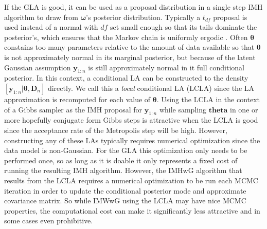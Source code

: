 \documentclass[12pt]{article}
\begin{document}
If the GLA is good, it can be used as a proposal distribution in a single step IMH algorithm to draw from $\bm{\omega}$'s posterior distribution. Typically a $t_{df}$ proposal is used instead of a normal with $df$ set small enough so that its tails dominate the posterior's, which ensures that the Markov chain is uniformly ergodic \citep[Theorem~7.8]{robert2013monte}. Often $\bm{\theta}$ constains too many parameters relative to the amount of data available so that $\bm{\theta}$ is not approximately normal in its marginal posterior, but because of the latent Gaussian assumption $\bm{y}_{1:n}$ is still approximately normal in it full conditional posterior. In this context, a conditional LA can be constructed to the density $[\bm{y}_{1:n}|\bm{\theta},\bm{D}_n]$ directly. We call this a \emph{local} conditional LA (LCLA) since the LA approximation is recomputed for each value of $\bm{\theta}$. Using the LCLA in the context of a Gibbs sampler as the IMH proposal for $\bm{y}_{1:n}$ while sampling $\bm{theta}$ in one or more hopefully conjugate form Gibbs steps is attractive when the LCLA is good since the acceptance rate of the Metropolis step will be high. However, constructing any of these LAs typically requires numerical optimization since the data model is non-Gaussian. For the GLA this optimization only needs to be performed once, so as long as it is doable it only represents a fixed cost of running the resulting IMH algorithm. However, the IMHwG algorithm that results from the LCLA requires a numerical optimization to be run each MCMC iteration in order to update the conditional posterior mode and approximate covariance matrix. So while IMWwG using the LCLA may have nice MCMC properties, the computational cost can make it significantly less attractive and in some cases even prohibitive.
\end{document}
